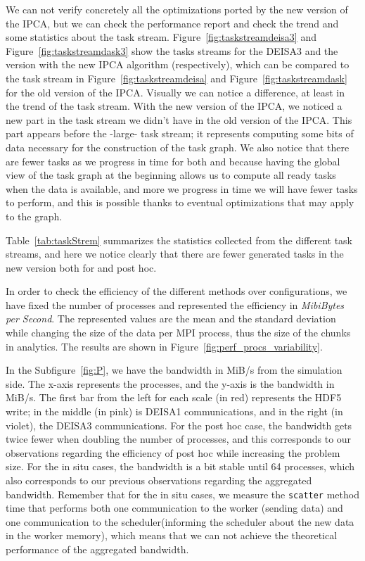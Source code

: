 We can not verify concretely all the optimizations ported by the new version of the IPCA, but we can check the performance report and check the trend and some statistics about the task stream. 
Figure~\ref{fig:taskstreamdeisa3} and Figure~\ref{fig:taskstreamdask3} show the tasks streams for the DEISA3 and the \dask version with the new IPCA algorithm (respectively), which can be compared to the task stream in Figure~\ref{fig:taskstreamdeisa} and Figure~\ref{fig:taskstreamdask} for the old version of the IPCA. 
Visually we can notice a difference, at least in the trend of the task stream.  
With the new version of the IPCA, we noticed a new part in the task stream we didn't have in the old version of the IPCA. This part appears before the -large- task stream; it represents computing some bits of data necessary for the construction of the task graph. We also notice that there are fewer tasks as we progress in time for both \deisa and \dask because having the global view of the task graph at the beginning allows us to compute all ready tasks when the data is available, and more we progress in time we will have fewer tasks to perform, and this is possible thanks to eventual optimizations that \dask may apply to the graph. 

Table~\ref{tab:taskStrem} summarizes the statistics collected from the different task streams, and here we notice clearly that there are fewer generated tasks in the new version both for \deisa and post hoc.    


In order to check the efficiency of the different methods over configurations, we have fixed the number of processes and represented the efficiency in \textit{MibiBytes per Second}.
The represented values are the mean and the standard deviation while changing the size of the data per MPI process, thus the size of the chunks in \dask analytics. The results are shown in Figure~\ref{fig:perf_procs_variability}. 

In the Subfigure~\ref{fig:P}, we have the bandwidth in MiB/s from the simulation side.
The x-axis represents the processes, and the y-axis is the bandwidth in MiB/s.
The first bar from the left for each scale (in red) represents the HDF5 write; in the middle (in pink) is DEISA1 communications, and in the right (in violet), the DEISA3 communications.  
For the post hoc case, the bandwidth gets twice fewer when doubling the number of processes, and this corresponds to our observations regarding the efficiency of post hoc while increasing the problem size.  
 For the in situ cases, the bandwidth is a bit stable until 64 processes, which also corresponds to our previous observations regarding the aggregated bandwidth.
 Remember that for the in situ cases, we measure the \texttt{scatter} method time that performs both one communication to the worker (sending data) and one communication to the scheduler(informing the scheduler about the new data in the worker memory), which means that we can not achieve the theoretical performance of the aggregated bandwidth.

